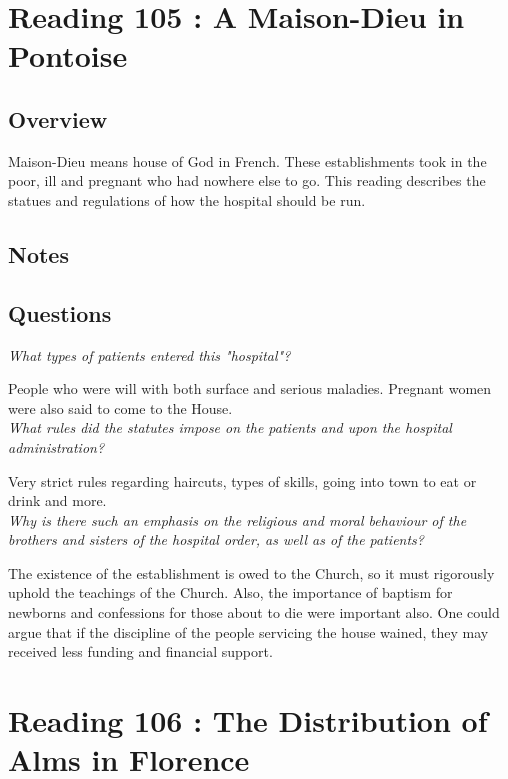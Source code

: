 \documentclass[12pt]{article}
\begin{document}
\section*{Reading 105 : A Maison-Dieu in Pontoise}

\subsection*{Overview}

Maison-Dieu means house of God in French. These establishments took in the poor, ill and pregnant who had nowhere else to go. This reading describes the statues and regulations of how the hospital should be run.

\subsection*{Notes}

\subsection*{Questions}

\textit{What types of patients entered this "hospital"?}

People who were will with both surface and serious maladies. Pregnant women were also said to come to the House.\\

\textit{What rules did the statutes impose on the patients and upon the hospital administration?}

Very strict rules regarding haircuts, types of skills, going into town to eat or drink and more.\\

\textit{Why is there such an emphasis on the religious and moral behaviour of the brothers and sisters of the hospital order, as well as of the patients?}

The existence of the establishment is owed to the Church, so it must rigorously uphold the teachings of the Church. Also, the importance of baptism for newborns and confessions for those about to die were important also. One could argue that if the discipline of the people servicing the house wained, they may received less funding and financial support. \\

\section*{Reading 106 : The Distribution of Alms in Florence}
\end{document}
